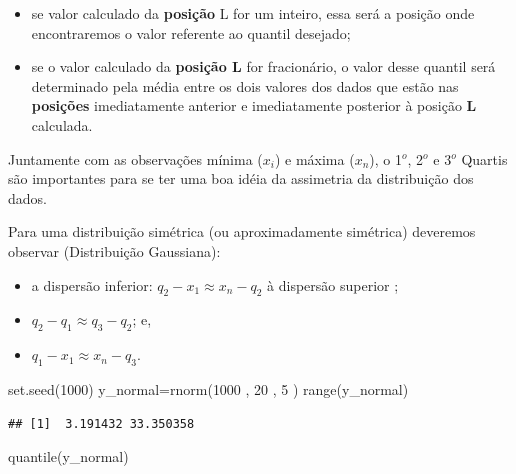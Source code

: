 \documentclass[
]{book}
\newenvironment{Shaded}{\begin{snugshade}}{\end{snugshade}}
\newcommand{\DecValTok}[1]{\textcolor[rgb]{0.00,0.00,0.81}{#1}}
\newcommand{\FunctionTok}[1]{\textcolor[rgb]{0.00,0.00,0.00}{#1}}
\newcommand{\NormalTok}[1]{#1}
\newcommand{\OtherTok}[1]{\textcolor[rgb]{0.56,0.35,0.01}{#1}}
\providecommand{\tightlist}{%
  \setlength{\itemsep}{0pt}\setlength{\parskip}{0pt}}
\begin{document}
\hfill\break

\begin{itemize}
\tightlist
\item
  se valor calculado da \textbf{posição} L for um inteiro, essa será a posição onde encontraremos o valor referente ao quantil desejado;\\
\item
  se o valor calculado da \textbf{posição L} for fracionário, o valor desse quantil será determinado pela média entre os dois valores dos dados que estão nas \textbf{posições} imediatamente anterior e imediatamente posterior à posição \textbf{L} calculada.
\end{itemize}

\hfill\break

Juntamente com as observações mínima (\(x_{i}\)) e máxima (\(x_{n}\)), o 1\(^{o}\), 2\(^{o}\) e 3\(^{o}\) Quartis são importantes para se ter uma boa idéia da assimetria da distribuição dos dados.

\hfill\break

Para uma distribuição simétrica (ou aproximadamente simétrica) deveremos observar (Distribuição Gaussiana):

\hfill\break

\begin{itemize}
\tightlist
\item
  a dispersão inferior: \(q_{2} - x_{1} \approx x_{n} - q_{2}\) à dispersão superior ;
\item
  \(q_{2} - q_{1} \approx q_{3} - q_{2}\); e,
\item
  \(q_{1} - x_{1} \approx x_{n} - q_{3}\).
\end{itemize}

\hfill\break

\begin{Shaded}
\begin{Highlighting}[]
\FunctionTok{set.seed}\NormalTok{(}\DecValTok{1000}\NormalTok{)}
\NormalTok{y\_normal}\OtherTok{=}\FunctionTok{rnorm}\NormalTok{(}\DecValTok{1000}\NormalTok{ , }\DecValTok{20}\NormalTok{ , }\DecValTok{5}\NormalTok{ )}
\FunctionTok{range}\NormalTok{(y\_normal)}
\end{Highlighting}
\end{Shaded}

\begin{verbatim}
## [1]  3.191432 33.350358
\end{verbatim}

\begin{Shaded}
\begin{Highlighting}[]
\FunctionTok{quantile}\NormalTok{(y\_normal)}
\end{Highlighting}
\end{Shaded}
\end{document}
